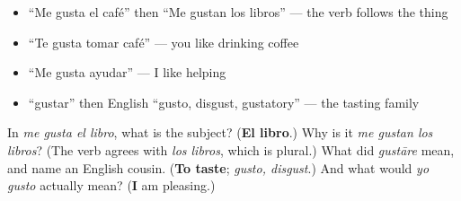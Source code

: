 \begin{itemize}
\raggedright
  \item \textquotedblleft{}Me gusta el café\textquotedblright{} then \textquotedblleft{}Me gustan los libros\textquotedblright{} — the verb follows the thing
  \item \textquotedblleft{}Te gusta tomar café\textquotedblright{} — you like drinking coffee
  \item \textquotedblleft{}Me gusta ayudar\textquotedblright{} — I like helping
  \item \textquotedblleft{}gustar\textquotedblright{} then English \textquotedblleft{}gusto, disgust, gustatory\textquotedblright{} — the tasting family
\end{itemize}

\begin{tcolorbox}[breakable,colback=teal!4,colframe=teal!35!black,title={Before you move on}]
In \emph{me gusta el libro}, what is the subject? (\textbf{El libro}.) Why is it \emph{me gustan los libros}? (The verb agrees with \emph{los libros}, which is plural.) What did \emph{gustāre} mean, and name an English cousin. (\textbf{To taste}; \emph{gusto, disgust}.) And what would \emph{yo gusto} actually mean? (\textbf{I} am pleasing.)
\end{tcolorbox}
